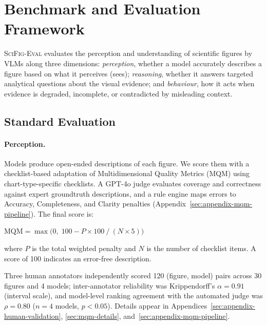 \section{Benchmark and Evaluation Framework}
\label{sec:framework}

\textsc{SciFig-Eval} evaluates the perception and understanding of scientific figures by VLMs along three dimensions: \emph{perception}, whether a model accurately describes a figure based on what it perceives (sees); \emph{reasoning}, whether it answers targeted analytical questions about the visual evidence; and \emph{behaviour}, how it acts when evidence is degraded, incomplete, or contradicted by misleading context. 



\subsection{Standard Evaluation}
\label{sec:mqm}

\paragraph{Perception.}
Models produce open-ended descriptions of each figure. We score them with a checklist-based adaptation of Multidimensional Quality Metrics (MQM) using chart-type-specific checklists. A GPT-4o judge evaluates coverage and correctness against expert groundtruth descriptions, and a rule engine maps errors to Accuracy, Completeness, and Clarity penalties (Appendix~\ref{sec:appendix-mqm-pipeline}). The final score is:

\begin{tcolorbox}[colback=gray!5, colframe=gray!50, boxrule=0.4pt, arc=2pt, left=4pt, right=4pt, top=3pt, bottom=3pt]
\small
$\text{MQM} = \max\!\bigl(0,\; 100 - P \times 100 \mathbin{/} (N \times 5)\bigr)$

\smallskip
\noindent where $P$ is the total weighted penalty and $N$ is the number of checklist items. A score of 100 indicates an error-free description.
\end{tcolorbox}

\noindent Three human annotators independently scored 120 (figure, model) pairs across 30 figures and 4 models; inter-annotator reliability was Krippendorff's $\alpha = 0.91$ (interval scale), and model-level ranking agreement with the automated judge was $\rho = 0.80$ ($n = 4$ models, $p < 0.05$). Details appear in Appendices~\ref{sec:appendix-human-validation}, \ref{sec:mqm-details}, and~\ref{sec:appendix-mqm-pipeline}.

